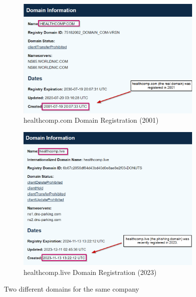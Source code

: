 \begin{fullwidth}
    \begin{figure}[H] %
        \label{sec:Fig6}
        \centering
        \begin{subfigure}{0.5\textwidth}
            \centering
            \includegraphics[width=1.37\linewidth]{assets/ICANN Lookup.png}
            \captionsetup{justification=centering}
            \caption{healthcomp.com Domain Registration (2001)}
        \end{subfigure}
        \hfill
        \begin{subfigure}{0.5\textwidth}
            \centering
            \includegraphics[width=1.37\linewidth]{assets/ICANN Lookup2.png}
            \captionsetup{justification=centering}
            \caption{healthcomp.live Domain Registration (2023)}
        \end{subfigure}
        \hfill
        \captionsetup{justification=centering}
        \caption{Two different domains for the same company}
    \end{figure}

\end{fullwidth}